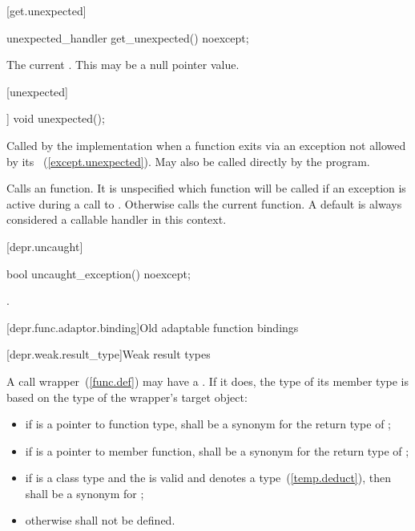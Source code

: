 [get.unexpected]{}

\begin{itemdecl}
unexpected_handler get_unexpected() noexcept;
\end{itemdecl}

\begin{itemdescr}
\pnum
\returns The current .
\enternote This may be a null pointer value. \exitnote
\end{itemdescr}

[unexpected]{}

%
\begin{itemdecl}
[[noreturn]] void unexpected();
\end{itemdecl}

\begin{itemdescr}
\pnum
\remarks
Called by the implementation when a function exits via an exception not allowed by its
~(\ref{except.unexpected}).
May also be called directly by the program.

\pnum
\effects
Calls an  function. It is unspecified which
 function will be called if an exception is active
during a call to .
Otherwise calls the current  function.
\enternote A default  is always considered a callable handler in
this context. \exitnote
\end{itemdescr}

[depr.uncaught]{}

%
\begin{itemdecl}
bool uncaught_exception() noexcept;
\end{itemdecl}

\begin{itemdescr}
\pnum
\returns {}.
\end{itemdescr}

[depr.func.adaptor.binding]{Old adaptable function bindings}

[depr.weak.result_type]{Weak result types}

\pnum
A call wrapper~(\ref{func.def}) may have a .
If it does, the type of its member type 
is based on the type  of the wrapper's target object:
\begin{itemize}
\item if  is a pointer to function type,
 shall be a synonym for the return type of ;
\item if  is a pointer to member function,
 shall be a synonym for the return type of ;
\item if  is a class type
and the   is valid and denotes a type~(\ref{temp.deduct}),
then  shall be a synonym for ;
\item otherwise  shall not be defined.
\end{itemize}

